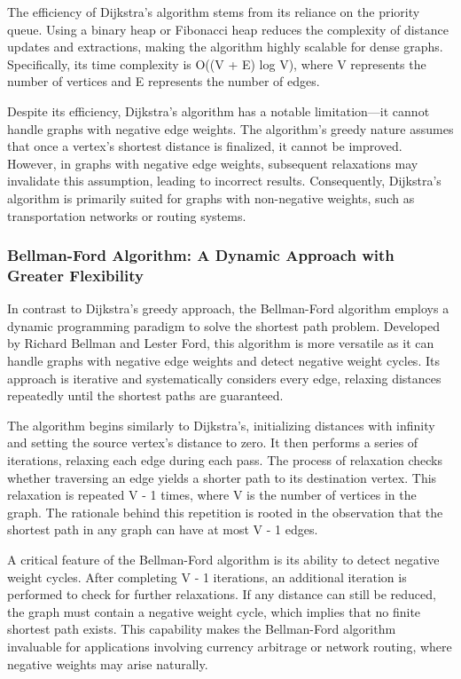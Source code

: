 \documentclass[12pt]{article}
\begin{document}
The efficiency of Dijkstra's algorithm stems from its reliance on the priority queue. Using a binary heap or Fibonacci heap reduces the complexity of distance updates and extractions, making the algorithm highly scalable for dense graphs. Specifically, its time complexity is O((V + E) log V), where V represents the number of vertices and E represents the number of edges. \par

Despite its efficiency, Dijkstra's algorithm has a notable limitation—it cannot handle graphs with negative edge weights. The algorithm's greedy nature assumes that once a vertex's shortest distance is finalized, it cannot be improved. However, in graphs with negative edge weights, subsequent relaxations may invalidate this assumption, leading to incorrect results. Consequently, Dijkstra's algorithm is primarily suited for graphs with non-negative weights, such as transportation networks or routing systems. \par

\subsubsection{Bellman-Ford Algorithm: A Dynamic Approach with Greater Flexibility}

In contrast to Dijkstra's greedy approach, the Bellman-Ford algorithm employs a dynamic programming paradigm to solve the shortest path problem. Developed by Richard Bellman and Lester Ford, this algorithm is more versatile as it can handle graphs with negative edge weights and detect negative weight cycles. Its approach is iterative and systematically considers every edge, relaxing distances repeatedly until the shortest paths are guaranteed. \par

The algorithm begins similarly to Dijkstra's, initializing distances with infinity and setting the source vertex's distance to zero. It then performs a series of iterations, relaxing each edge during each pass. The process of relaxation checks whether traversing an edge yields a shorter path to its destination vertex. This relaxation is repeated V - 1 times, where V is the number of vertices in the graph. The rationale behind this repetition is rooted in the observation that the shortest path in any graph can have at most V - 1 edges. \par

A critical feature of the Bellman-Ford algorithm is its ability to detect negative weight cycles. After completing V - 1 iterations, an additional iteration is performed to check for further relaxations. If any distance can still be reduced, the graph must contain a negative weight cycle, which implies that no finite shortest path exists. This capability makes the Bellman-Ford algorithm invaluable for applications involving currency arbitrage or network routing, where negative weights may arise naturally. \par
\end{document}
